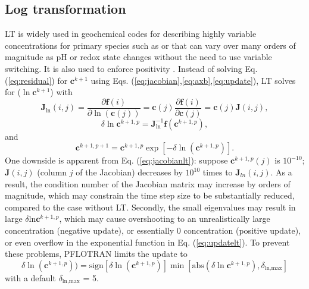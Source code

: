 \documentclass[gmd, manuscript]{copernicus}
\begin{document}
\subsection{Log transformation}
LT is widely used in geochemical codes for describing highly variable
concentrations for primary species such as  or  that can
vary over many orders of magnitude as pH or redox state changes without the
need to use variable switching. It is also used to enforce positivity
\citep{Bethke2007,Hammond2003,Parkhurst1999}. Instead of solving Eq.
(\ref{eq:residual}) for $\mathbf{c}^{k+1}$ using Eqs.
(\ref{eq:jacobian},\ref{eq:axb},\ref{eq:update}), LT solves for
($\ln\mathbf{c}^{k+1}$) with
\begin{equation}
\mathbf{J}_{\ln}(i,j)=\frac{\partial \mathbf{f}(i)}{\partial
\ln(\mathbf{c}(j))} = \mathbf{c}(j) \frac{\partial
\mathbf{f}(i)}{\partial \mathbf{c}(j)} = \mathbf{c}(j) \mathbf{J}(i,j),
\label{eq:jacobianlt}
\end{equation}
\begin{equation}
\delta \ln\mathbf{c}^{k+1,p}= \mathbf{J}^{-1}_{\ln} \mathbf{f} (\mathbf{c}^{k+1,p}),
\label{eq:axblt}
\end{equation}
and
\begin{equation}
\mathbf{c}^{k+1,p+1}=\mathbf{c}^{k+1,p}\exp[-\delta
\ln(\mathbf{c}^{k+1,p})].
\label{eq:updatelt}	
\end{equation}
One downside is apparent from Eq. (\ref{eq:jacobianlt}): suppose
$\mathbf{c}^{k+1,p}(j)$ is $10^{-10}$; $\mathbf{J}(i,j)$ (column $j$ of the
Jacobian) decreases by $10^{10}$ times to $\mathbf{J}_{ln}(i,j)$. As a result,
the condition number of the Jacobian matrix may increase by orders of
magnitude, which may constrain the time step size to be substantially reduced,
compared to the case without LT.  Secondly, the small
eigenvalues may result in large $\delta \text{ln} \mathbf{c}^{k+1,p}$, which
may cause overshooting to an unrealistically large concentration (negative update), or
essentially 0 concentration (positive update), or even overflow in the
exponential function in Eq. (\ref{eq:updatelt}).  To prevent these problems,
PFLOTRAN limits the update to 
\begin{equation}
\delta \ln(\mathbf{c}^{k+1,p}))=\text{sign}[\delta
\ln(\mathbf{c}^{k+1,p})]\min[\text{abs}(\delta \ln
\mathbf{c}^{k+1,p}),\delta_\text{ln,max}]
\label{eq:lnlimit}
\end{equation}
with a default $\delta_\text{ln,max}$ = 5. %
\end{document}

